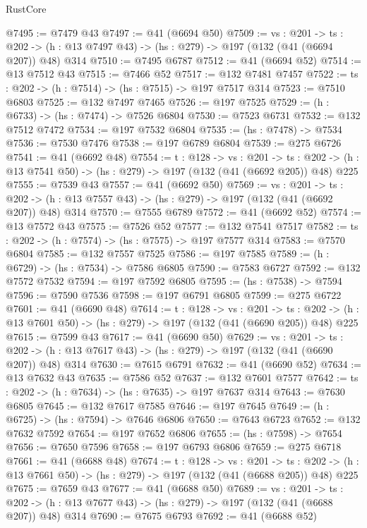 \begin{lexlean}{RustCore}
\begin{coremodule}
@7495 := @7479 @43
@7497 := @41 (@6694 @50)
@7509 := {vs : @201} ->
  {ts : @202} -> (h : @13 @7497 @43) -> (hs : @279) -> @197 (@132 (@41 (@6694 @207)) @48) @314
@7510 := @7495 @6787
@7512 := @41 (@6694 @52)
@7514 := @13 @7512 @43
@7515 := @7466 @52
@7517 := @132 @7481 @7457
@7522 := {ts : @202} -> (h : @7514) -> (hs : @7515) -> @197 @7517 @314
@7523 := @7510 @6803
@7525 := @132 @7497 @7465
@7526 := @197 @7525
@7529 := (h : @6733) -> (hs : @7474) -> @7526 @6804
@7530 := @7523 @6731
@7532 := @132 @7512 @7472
@7534 := @197 @7532 @6804
@7535 := (hs : @7478) -> @7534
@7536 := @7530 @7476
@7538 := @197 @6789 @6804
@7539 := @275 @6726
@7541 := @41 (@6692 @48)
@7554 := {t : @128} ->
  {vs : @201} ->
  {ts : @202} -> (h : @13 @7541 @50) -> (hs : @279) -> @197 (@132 (@41 (@6692 @205)) @48) @225
@7555 := @7539 @43
@7557 := @41 (@6692 @50)
@7569 := {vs : @201} ->
  {ts : @202} -> (h : @13 @7557 @43) -> (hs : @279) -> @197 (@132 (@41 (@6692 @207)) @48) @314
@7570 := @7555 @6789
@7572 := @41 (@6692 @52)
@7574 := @13 @7572 @43
@7575 := @7526 @52
@7577 := @132 @7541 @7517
@7582 := {ts : @202} -> (h : @7574) -> (hs : @7575) -> @197 @7577 @314
@7583 := @7570 @6804
@7585 := @132 @7557 @7525
@7586 := @197 @7585
@7589 := (h : @6729) -> (hs : @7534) -> @7586 @6805
@7590 := @7583 @6727
@7592 := @132 @7572 @7532
@7594 := @197 @7592 @6805
@7595 := (hs : @7538) -> @7594
@7596 := @7590 @7536
@7598 := @197 @6791 @6805
@7599 := @275 @6722
@7601 := @41 (@6690 @48)
@7614 := {t : @128} ->
  {vs : @201} ->
  {ts : @202} -> (h : @13 @7601 @50) -> (hs : @279) -> @197 (@132 (@41 (@6690 @205)) @48) @225
@7615 := @7599 @43
@7617 := @41 (@6690 @50)
@7629 := {vs : @201} ->
  {ts : @202} -> (h : @13 @7617 @43) -> (hs : @279) -> @197 (@132 (@41 (@6690 @207)) @48) @314
@7630 := @7615 @6791
@7632 := @41 (@6690 @52)
@7634 := @13 @7632 @43
@7635 := @7586 @52
@7637 := @132 @7601 @7577
@7642 := {ts : @202} -> (h : @7634) -> (hs : @7635) -> @197 @7637 @314
@7643 := @7630 @6805
@7645 := @132 @7617 @7585
@7646 := @197 @7645
@7649 := (h : @6725) -> (hs : @7594) -> @7646 @6806
@7650 := @7643 @6723
@7652 := @132 @7632 @7592
@7654 := @197 @7652 @6806
@7655 := (hs : @7598) -> @7654
@7656 := @7650 @7596
@7658 := @197 @6793 @6806
@7659 := @275 @6718
@7661 := @41 (@6688 @48)
@7674 := {t : @128} ->
  {vs : @201} ->
  {ts : @202} -> (h : @13 @7661 @50) -> (hs : @279) -> @197 (@132 (@41 (@6688 @205)) @48) @225
@7675 := @7659 @43
@7677 := @41 (@6688 @50)
@7689 := {vs : @201} ->
  {ts : @202} -> (h : @13 @7677 @43) -> (hs : @279) -> @197 (@132 (@41 (@6688 @207)) @48) @314
@7690 := @7675 @6793
@7692 := @41 (@6688 @52)

\end{coremodule}
\end{lexlean}
